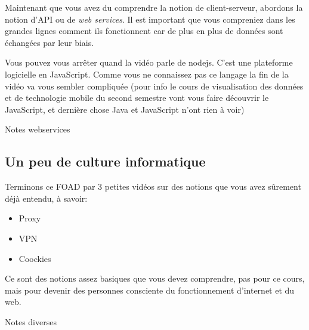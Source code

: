 \documentclass[a4paper]{article}
\begin{document}
Maintenant que vous avez du comprendre la notion de client-serveur,
abordons la notion d'API ou de \emph{web services}. Il est important que
vous compreniez dans les grandes lignes comment ils fonctionnent car de
plus en plus de données sont échangées par leur biais.

Vous pouvez vous arrêter quand la vidéo parle de nodejs. C'est une
plateforme logicielle en JavaScript. Comme vous ne connaissez pas ce
langage la fin de la vidéo va vous sembler compliquée (pour info le
cours de visualisation des données et de technologie mobile du second
semestre vont vous faire découvrir le JavaScript, et dernière chose Java
et JavaScript n'ont rien à voir)

            Notes webservices

\hypertarget{header-n68}{%
\subsection{Un peu de culture informatique}\label{header-n68}}

Terminons ce FOAD par 3 petites vidéos sur des notions que vous avez
sûrement déjà entendu, à savoir:

\begin{itemize}
\item
  Proxy
\item
  VPN
\item
  Coockies
\end{itemize}

Ce sont des notions assez basiques que vous devez comprendre, pas pour
ce cours, mais pour devenir des personnes consciente du fonctionnement
d'internet et du web.

 

            Notes diverses
\end{document}
